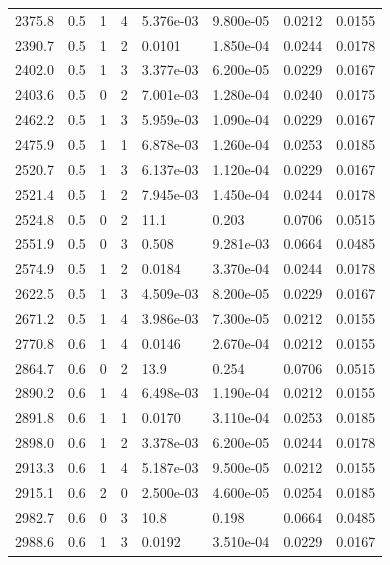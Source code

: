 \documentclass[preview]{standalone}
\begin{document}
{{{\begin{tabular}{L{1.2cm}C{1.2cm} C{0.3cm}C{0.5cm} C{1.4cm}C{1.4cm} C{1.4cm}C{1.4cm}}
  2375.8  &   0.5  & 1     &  4 &  5.376e-03  & 9.800e-05  & 0.0212 &  0.0155   \\ 
  2390.7  &   0.5  & 1     &  2 &  0.0101  & 1.850e-04  & 0.0244 &  0.0178   \\ 
  2402.0  &   0.5  & 1     &  3 &  3.377e-03  & 6.200e-05  & 0.0229 &  0.0167   \\ 
  2403.6  &   0.5  & 0     &  2 &  7.001e-03  & 1.280e-04  & 0.0240 &  0.0175   \\ 
  2462.2  &   0.5  & 1     &  3 &  5.959e-03  & 1.090e-04  & 0.0229 &  0.0167   \\ 
  2475.9  &   0.5  & 1     &  1 &  6.878e-03  & 1.260e-04  & 0.0253 &  0.0185   \\ 
  2520.7  &   0.5  & 1     &  3 &  6.137e-03  & 1.120e-04  & 0.0229 &  0.0167   \\ 
  2521.4  &   0.5  & 1     &  2 &  7.945e-03  & 1.450e-04  & 0.0244 &  0.0178   \\ 
  2524.8  &   0.5  & 0     &  2 &  11.1  & 0.203  & 0.0706 &  0.0515   \\ 
  2551.9  &   0.5  & 0     &  3 &  0.508  & 9.281e-03  & 0.0664 &  0.0485   \\ 
  2574.9  &   0.5  & 1     &  2 &  0.0184  & 3.370e-04  & 0.0244 &  0.0178   \\ 
  2622.5  &   0.5  & 1     &  3 &  4.509e-03  & 8.200e-05  & 0.0229 &  0.0167   \\ 
  2671.2  &   0.5  & 1     &  4 &  3.986e-03  & 7.300e-05  & 0.0212 &  0.0155   \\ 
  2770.8  &   0.6  & 1     &  4 &  0.0146  & 2.670e-04  & 0.0212 &  0.0155   \\ 
  2864.7  &   0.6  & 0     &  2 &  13.9  & 0.254  & 0.0706 &  0.0515   \\ 
  2890.2  &   0.6  & 1     &  4 &  6.498e-03  & 1.190e-04  & 0.0212 &  0.0155   \\ 
  2891.8  &   0.6  & 1     &  1 &  0.0170  & 3.110e-04  & 0.0253 &  0.0185   \\ 
  2898.0  &   0.6  & 1     &  2 &  3.378e-03  & 6.200e-05  & 0.0244 &  0.0178   \\ 
  2913.3  &   0.6  & 1     &  4 &  5.187e-03  & 9.500e-05  & 0.0212 &  0.0155   \\ 
  2915.1  &   0.6  & 2     &  0 &  2.500e-03  & 4.600e-05  & 0.0254 &  0.0185   \\ 
  2982.7  &   0.6  & 0     &  3 &  10.8  & 0.198  & 0.0664 &  0.0485   \\ 
  2988.6  &   0.6  & 1     &  3 &  0.0192  & 3.510e-04  & 0.0229 &  0.0167   \\ 

\end{tabular}}}}
\end{document}
